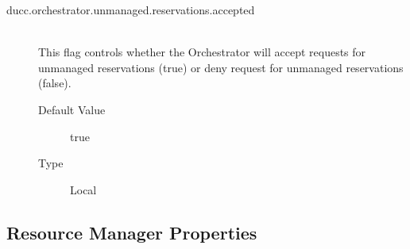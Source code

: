 \begin{description}
      \item[ducc.orchestrator.unmanaged.reservations.accepted] \hfill \\
        This flag controls whether the Orchestrator will accept requests for
        unmanaged reservations (true) or deny request for unmanaged reservations
        (false).
        \begin{description}
          \item[Default Value] true
          \item[Type] Local 
        \end{description}      
      \end{description}

\subsection{Resource Manager Properties}

